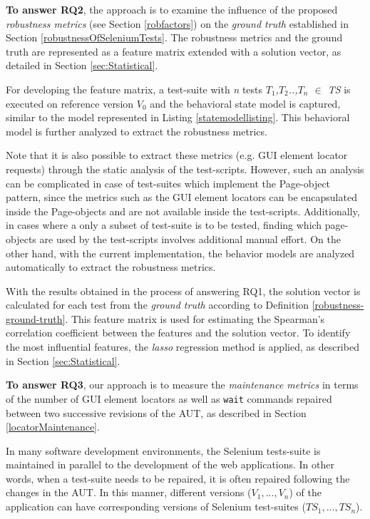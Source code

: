 \textbf{To answer RQ2}, the approach is to examine the influence of the proposed \textit{robustness metrics } (see Section \ref{robfactors}) on the \textit{ground truth} established in Section \ref{robustnessOfSeleniumTests}. The robustness metrics and the ground truth are represented as a feature matrix extended with a solution vector, as detailed in Section \ref{sec:Statistical}. 

For developing the feature matrix, a test-suite with \textit{n} tests \textit{$T_1$,$T_2$..,$T_n$ $\in$ TS} is executed on reference version \textit{$V_{0}$} and the behavioral state model is captured, similar to the model represented in Listing \ref{statemodellisting}. This behavioral model is further analyzed to extract the robustness metrics. 

Note that it is also possible to extract these metrics (e.g. GUI element locator requests) through the static analysis of the test-scripts. However, such an analysis can be complicated in case of test-suites which implement the Page-object pattern, since the metrics such as the GUI element locators can be encapsulated inside the Page-objects and are not available inside the test-scripts. Additionally, in cases where a only a subset of test-suite is to be tested, finding which page-objects are used by the test-scripts involves additional manual effort. On the other hand, with the current implementation, the behavior models are analyzed automatically to extract the robustness metrics. 

With the results obtained in the process of answering RQ1, the solution vector is calculated for each test from the \textit{ground truth} according to Definition \ref{robustness-ground-truth}. This feature matrix is used for estimating the Spearman's correlation coefficient between the features and the solution vector. To identify the most influential features, the \textit{lasso} regression method is applied, as described in Section \ref{sec:Statistical}. 

\textbf{To answer RQ3}, our approach is to measure the \textit{maintenance metrics} in terms of the number of GUI element locators as well as \texttt{wait} commands repaired between two successive revisions of the AUT, as described in Section \ref{locatorMaintenance}.

In many software development environments, the Selenium tests-suite is maintained in parallel to the development of the web applications. In other words, when a test-suite needs to be repaired, it is often repaired following the changes in the AUT. In this manner, different versions (\textit{$V_1,...,V_n$}) of the application can have corresponding versions of Selenium test-suites (\textit{$TS_1,...,TS_n$}). 

